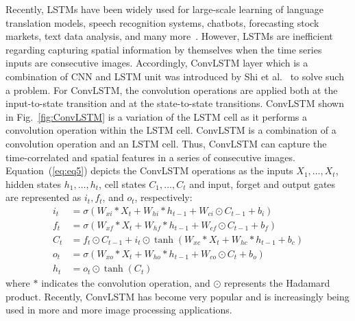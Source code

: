 Recently, LSTMs have been widely used for large-scale learning of language translation models, speech recognition systems, chatbots, forecasting stock markets, text data analysis, and many more~\cite{graves2014towards, cho2014properties}. 
However, LSTMs are inefficient regarding capturing spatial information by themselves when the time series inputs are consecutive images.
Accordingly, ConvLSTM layer which is a combination of CNN and LSTM unit was introduced by Shi et al.~\cite{xingjian2015convolutional} to solve such a problem.
For ConvLSTM, the convolution operations are applied both at the input-to-state transition and at the state-to-state transitions.  
ConvLSTM shown in Fig.~\ref{fig:ConvLSTM} is a variation of the LSTM cell as it performs a convolution operation within the LSTM cell.
ConvLSTM is a combination of a convolution operation and an LSTM cell.
Thus, ConvLSTM can capture the time-correlated and spatial features in a series of consecutive images. 
Equation~(\ref{eq:eq5}) depicts the ConvLSTM operations as the inputs \(X_1, \dots, X_t\), hidden states \(h_1, \dots, h_t\), cell states \(C_1, \dots, C_t\) and input, forget and output gates are represented as \(i_t, f_t\), and \(o_t\), respectively:
\begin{equation}
	\begin{aligned}
		i_{t} &=\sigma\left(W_{x i} * X_{t}+W_{h i} * h_{t-1}+W_{c i} \odot C_{t-1}+b_{i}\right) 
		\\
		f_{t} &=\sigma\left(W_{x f} * X_{t}+W_{h f} * h_{t-1}+W_{c f} \odot C_{t-1}+b_{f}\right) \\
		C_{t} &=f_{t} \odot C_{t-1}+i_{t} \odot \tanh \left(W_{x c} * X_{t}+W_{h c} * h_{t-1}+b_{c}\right) 
		\\
		o_{t} &=\sigma\left(W_{x o} * X_{t}+W_{h o} * h_{t-1}+W_{c o} \odot C_{t}+b_{o}\right) \\
		h_{t} &=o_{t} \odot \tanh \left(C_{t}\right)
	\end{aligned}
	\label{eq:eq5}
\end{equation}
where \(*\) indicates the convolution operation, and \(\odot\) represents the 
Hadamard product. 
Recently, ConvLSTM has become very popular and is increasingly being used in 
more and more image processing applications.